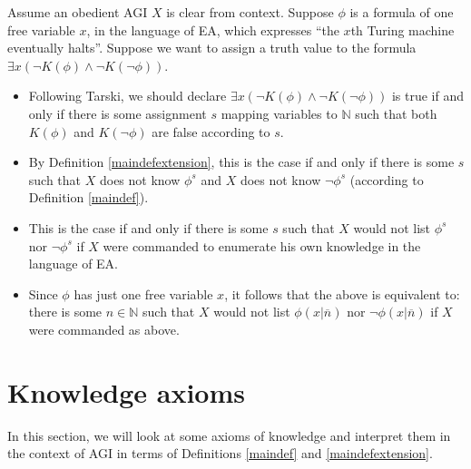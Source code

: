 \documentclass[runningheads]{llncs}
\begin{document}
\begin{example}
  Assume an obedient AGI $X$ is clear from context.
  Suppose $\phi$ is a formula of one free variable $x$, in the language of EA,
  which expresses ``the $x$th Turing machine eventually halts''. Suppose we want to
  assign a truth value to the formula $\exists x (\neg K(\phi)\wedge \neg K(\neg\phi))$.
  \begin{itemize}
  \item Following Tarski, we should declare $\exists x (\neg K(\phi)\wedge\neg K(\neg \phi))$
  is true if and only if there is some assignment $s$ mapping variables to $\mathbb N$
  such that both $K(\phi)$ and $K(\neg\phi)$ are false according to $s$.
  \item By Definition \ref{maindefextension}, this is the case if and only if
  there is some $s$ such that
  $X$ does not know $\phi^s$ and $X$ does not know $\neg\phi^s$
  (according to Definition \ref{maindef}).
  \item
  This is the case if and only if there is some $s$ such that $X$ would not
  list $\phi^s$ nor $\neg\phi^s$ if $X$ were commanded
  to enumerate his own knowledge in the language of EA.
  \item
  Since $\phi$ has just one free variable $x$, it follows that the above is equivalent to:
  there is some $n\in\mathbb N$ such that $X$ would not list $\phi(x|\overline n)$
  nor $\neg\phi(x|\overline n)$
  if $X$ were commanded as above.
  \end{itemize}
\end{example}

\section{Knowledge axioms}
\label{appsection}

In this section, we will look at some axioms of knowledge and interpret them in the
context of AGI in terms of Definitions \ref{maindef} and \ref{maindefextension}.
\end{document}
